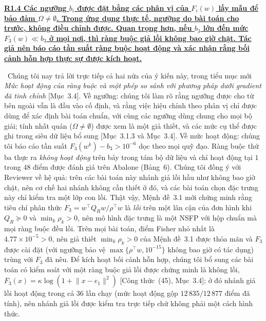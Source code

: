 \documentclass[11pt]{article}
\newcommand{\response}[1]{\smallskip\noindent{\color{blue!60!black}\textbf{Trả lời.}}\ #1\par\medskip}
\newcommand{\loc}[1]{\textcolor{blue!50!black}{[#1]}}
\newenvironment{point}[1]{\medskip\noindent\textbf{\uline{#1}}\par}{\par}
\begin{document}
\begin{point}{R1.4 Các ngưỡng $b_i$ được đặt bằng các phân vị của $F_i(w)$ lấy mẫu để
bảo đảm $\Omega\neq\emptyset$. Trong ứng dụng thực tế, ngưỡng do bài toán cho trước,
không điều chỉnh được. Quan trọng hơn, nếu $b_3$ lớn đến mức $F_3(w)\ll b_3$ ở mọi nơi, thì
ràng buộc giả lồi không bao giờ chặt. Tác giả nên báo cáo tần suất ràng buộc hoạt động
và xác nhận rằng bối cảnh hỗn hợp thực sự được kích hoạt.}
\response{Chúng tôi nay trả lời trực tiếp cả hai nửa của ý kiến này, trong tiểu mục mới
\emph{Mức hoạt động của ràng buộc và một phép so sánh với phương pháp dưới gradient đã tinh chỉnh} \loc{Mục~3.4}. Về
ngưỡng: chúng tôi làm rõ rằng ngưỡng được cho từ bên ngoài vẫn là đầu vào cố định, và rằng
việc hiệu chỉnh theo phân vị chỉ được dùng để xác định bài toán chuẩn, với cùng
các ngưỡng dùng chung cho mọi bộ giải; tính nhất quán ($\Omega\neq\emptyset$) được xem là một
giả thiết, và các mức cụ thể được ghi trong siêu dữ liệu bổ sung
\loc{Mục~3.1.3 và Mục~3.4}. Về mức hoạt động: chúng tôi báo cáo tần suất
$F_3(w^k)-b_3>10^{-6}$ dọc theo mọi quỹ đạo. Ràng buộc thứ ba thực ra
\emph{không hoạt động} trên bảy trong tám bộ dữ liệu và chỉ hoạt động tại $1$ trong $48$ điểm được
đánh giá trên Abalone (Bảng~6). Chúng tôi đồng ý với Reviewer về hệ quả: trên các bài toán này nhánh giả lồi hầu như không bao giờ chặt, nên
cơ chế hai nhánh không cần thiết ở đó, và các bài toán chọn đặc trưng này chỉ kiểm tra một lớp con lồi. Thật vậy, Mệnh đề~3.1 mới chứng minh rằng
tiêu chí phân thức $F_3=w^{\top}Q_Rw/\rho^{\top}w$ là \emph{lồi} trên một lân cận
của đơn hình khi $Q_R\succeq0$ và $\min_k\rho_k>0$, nên mô hình đặc trưng là
một NSFP với hộp chuẩn mà mọi ràng buộc đều lồi. Trên mọi bài toán, điểm Fisher nhỏ nhất là $4.77\times10^{-5}>0$, nên giả thiết $\min_k\rho_k>0$ của Mệnh đề~3.1 được thỏa mãn và $F_3$ được cài đặt (với ngưỡng bảo vệ $\max\{\rho^{\top}w,10^{-15}\}$ không bao giờ có tác dụng) trùng với $F_3$ đã nêu. Để kích hoạt bối cảnh hỗn hợp, chúng tôi bổ sung các bài toán
có kiểm soát với một ràng buộc giả lồi được chứng minh là không lồi,
$F_3(x)=\kappa\log(1+\lVert x-e_1\rVert^2)$ \loc{Công thức~(45), Mục~3.4}; ở đó
nhánh giả lồi hoạt động trong cả $36$ lần chạy (mức hoạt động gộp $12\,835/12\,877$ điểm
đã tính), nên nhánh giả lồi được kiểm tra trực tiếp chứ không phải một cách hình thức.}
\end{point}
\end{document}
